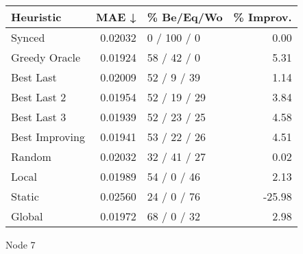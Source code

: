 \begin{tabular}{lrlr}
\toprule
\textbf{Heuristic} & \textbf{MAE ↓} & \textbf{\% Be/Eq/Wo} & \textbf{\% Improv.} \\
\midrule
            Synced &        0.02032 &          0 / 100 / 0 &                0.00 \\
     Greedy Oracle &        0.01924 &          58 / 42 / 0 &                5.31 \\
         Best Last &        0.02009 &          52 / 9 / 39 &                1.14 \\
       Best Last 2 &        0.01954 &         52 / 19 / 29 &                3.84 \\
       Best Last 3 &        0.01939 &         52 / 23 / 25 &                4.58 \\
    Best Improving &        0.01941 &         53 / 22 / 26 &                4.51 \\
            Random &        0.02032 &         32 / 41 / 27 &                0.02 \\
             Local &        0.01989 &          54 / 0 / 46 &                2.13 \\
            Static &        0.02560 &          24 / 0 / 76 &              -25.98 \\
            Global &        0.01972 &          68 / 0 / 32 &                2.98 \\
\bottomrule
\end{tabular}
\caption{Node 7}
\label{tab:iid_lr01_le2_bs2_7}
